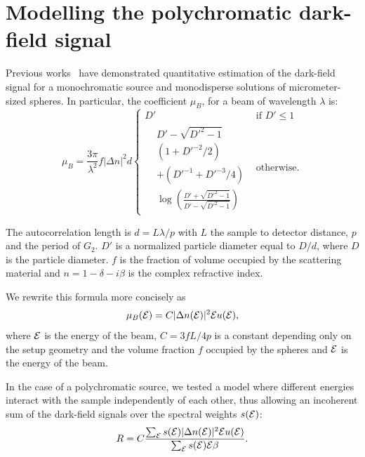 \section{Modelling the polychromatic dark-field signal}\label{sec:model}
Previous works~\parencite{Lynch:11,Gkoumas2016} have demonstrated quantitative estimation of
the dark-field signal for a monochromatic source and monodisperse solutions
of micrometer-sized spheres. In particular, the coefficient $\mu_B$, for a
beam of wavelength $\lambda$ is:
\begin{equation}
\mu_B = \frac{3\pi}{\lambda^2}f |\Delta n|^2 d
    \begin{cases}
    D' & \text{if } D' \leq 1\\
    \begin{aligned}
    & D' - \sqrt{D'^2 - 1}\\
    & (1 + D'^{-2}/2) \\
    & + (D'^{-1} + D'^{-3} / 4) \\
    & \log\left(\frac{D' + \sqrt{D'^2 - 1}}{D' - \sqrt{D'^2 - 1}}\right)
    \end{aligned} & \text{otherwise.}
    \end{cases}\label{eqn:lynch}
\end{equation}

The autocorrelation length is $d = L\lambda / p$ with $L$ the sample to
detector distance, $p$ and the period of $G_2$. $D'$ is a normalized
particle diameter equal to $D/d$, where $D$ is the particle diameter. $f$ is
the fraction of volume occupied by the scattering material and $n = 1 -
\delta - i\beta$ is the complex refractive index.

We rewrite this formula more concisely as
\begin{equation}
    \mu_B(\mathcal{E}) = C |\Delta n(\mathcal{E})|^2 \mathcal{E} u(\mathcal{E}),
    \label{eqn:lynchshort}
\end{equation}
where $\mathcal{E}$ is the energy of the beam, $C = 3 fL / 4p$ is a constant
depending only on the setup geometry and the volume fraction $f$ occupied by
the spheres and $\mathcal{E}$ is the energy of the beam.

In the case of a polychromatic source, we tested a model where different
energies interact with the sample independently of each other, thus allowing
an incoherent sum of the dark-field signals over the spectral weights
$s(\mathcal{E})$:
\begin{equation}
    R = C \frac{\sum_{\mathcal{E}} s(\mathcal{E})|\Delta n(\mathcal{E})|^2 \mathcal{E} u(\mathcal{E})}{\sum_{\mathcal{E}} s(\mathcal{E}) \mathcal{E} \beta}.
    \label{eqn:lynchpolychromatic}
\end{equation}

